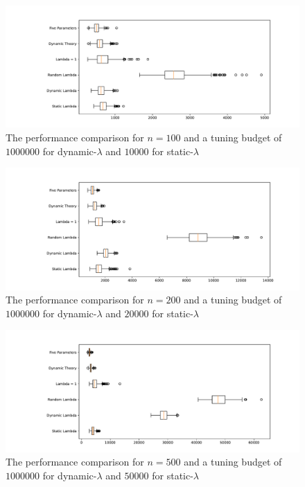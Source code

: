 \documentclass{article}
\begin{document}
\begin{figure}[ht]
    \centering
        \includegraphics[width=1.0\textwidth]{box_plot_100_100_10000.pdf}
        \caption{The performance comparison for $n = 100$ and a tuning budget of $1000000$ for dynamic-$\lambda$ and $10000$ for static-$\lambda$}
        \label{box_plot_100_100_10000}
\end{figure}

\begin{figure}[ht]
    \centering
        \includegraphics[width=1.0\textwidth]{box_plot_200_100_5000.pdf}
        \caption{The performance comparison for $n = 200$ and a tuning budget of $1000000$ for dynamic-$\lambda$ and $20000$ for static-$\lambda$}
        \label{box_plot_200_100_5000}
\end{figure}

\begin{figure}[ht]
    \centering
        \includegraphics[width=1.0\textwidth]{box_plot_500_100_2000.pdf}
        \caption{The performance comparison for $n = 500$ and a tuning budget of $1000000$ for dynamic-$\lambda$ and $50000$ for static-$\lambda$}
        \label{box_plot_500_100_2000}
\end{figure}
\end{document}
